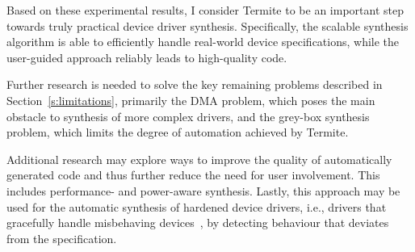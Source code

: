 Based on these experimental results, I consider Termite to be an important step towards truly practical device driver synthesis. Specifically, the scalable synthesis algorithm is able to efficiently handle real-world device specifications, while the user-guided approach reliably leads to high-quality code.

Further research is needed to solve the key remaining problems described in Section~\ref{s:limitations}, primarily the DMA problem, which poses the main obstacle to synthesis of more complex drivers, and the grey-box synthesis problem, which limits the degree of automation achieved by Termite. 

Additional research may explore ways to improve the quality of automatically generated code and thus further reduce the need for user involvement. This includes performance- and power-aware synthesis. Lastly, this approach may be used for the automatic synthesis of hardened device drivers, i.e., drivers that gracefully handle misbehaving devices~\cite{Kadav_RS_09}, by detecting behaviour that deviates from the specification.


